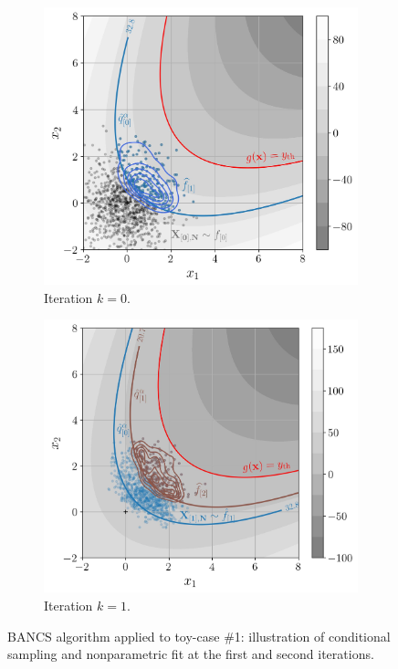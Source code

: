 \begin{figure}[!ht]
    \centering
    \begin{subfigure}[b]{0.49\linewidth}
        \centering
        \includegraphics[width=\linewidth]{part3/figures/BANCS/bancs_illustration0.jpg}
        \caption{Iteration $k=0$.}
    \end{subfigure}
    \begin{subfigure}[b]{0.49\linewidth}
        \centering
        \includegraphics[width=\linewidth]{part3/figures/BANCS/bancs_illustration1.jpg}
        \caption{Iteration $k=1$.}
    \end{subfigure}
    \caption{BANCS algorithm applied to toy-case \#1: illustration of conditional sampling and nonparametric fit at the first and second iterations.}
    \label{fig:bancs_illustration1}
\end{figure}

